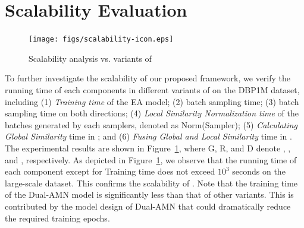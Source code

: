 \section{Scalability Evaluation}
\label{app:scalability}

\begin{figure}[t]
\centering
\texttt{[image: figs/scalability-icon.eps]}\vspace*{-4.5mm}\\
\caption{Scalability analysis vs. variants of \ClusterEA{}}
\label{fig:scalability}
\end{figure}
To further investigate the scalability of our proposed \ClusterEA{} framework, we verify the running time of each components in different variants of \ClusterEA{} on the DBP1M dataset, including (1) \emph{Training time} of the EA model; (2) \emph{\KMeans{}} batch sampling time; (3) \emph{\MetisGCN{}} batch sampling time on both directions; (4) \emph{Local Similarity Normalization time} of the batches generated by each samplers, denoted as Norm(Sampler); (5) \emph{Calculating Global Similarity} time in \Merging{}; and (6) \emph{Fusing Global and Local Similarity} time in \Merging{}. 
The experimental results are shown in Figure~\ref{fig:scalability}, where G, R, and D denote , , and , respectively. As depicted in Figure~\ref{fig:scalability}, we observe that the running time of each component except for Training time does not exceed $10^3$ seconds on the large-scale dataset.
This confirms the scalability of \ClusterEA{}. Note that the training time of the Dual-AMN model is significantly less than that of other variants. This is contributed by the model design of Dual-AMN that could dramatically reduce the required training epochs.

